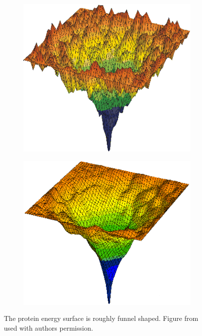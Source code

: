 \begin{figure}[h]
\centering
\begin{subfigure}[b]{0.3\textwidth}
    \centering
    \includegraphics[width=\textwidth]{figures/drysurf.png}
    \label{fig:dry}
    \caption{}
\end{subfigure}%
\hspace{0.1\textwidth}
\begin{subfigure}[b]{0.3\textwidth}
    \centering
    \includegraphics[width=\textwidth]{figures/wetsurf.png}
    \label{fig:wet}
    \caption{}
\end{subfigure}
\caption{
The protein energy surface is roughly funnel shaped.
Figure from \protect\cite{waterwebsite} used with authors permission.
}
\label{fig:funnel}
\end{figure}
